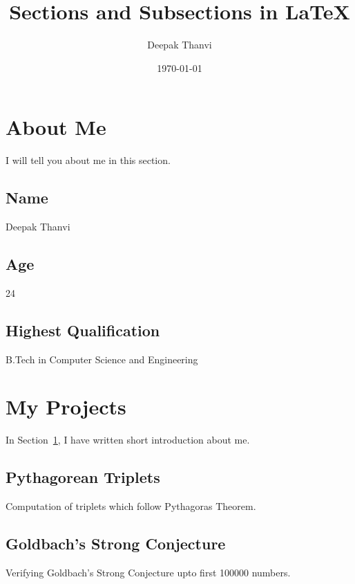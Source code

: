 \documentclass{article}
\title{Sections and Subsections in LaTeX}
\author{Deepak Thanvi}
\date{\today}
\begin{document}
\section{About Me}\label{first_section}
I will tell you about me in this section.

	\subsection{Name}
	
	Deepak Thanvi
	
	\subsection{Age}
	
	24

	\subsection{Highest Qualification}
	
	B.Tech in Computer Science and Engineering
    
\section{My Projects}\label{second_section}
In Section~\ref{first_section}, I have written short introduction about me.

	\subsection{Pythagorean Triplets}
	
	Computation of triplets which follow Pythagoras Theorem.

	\subsection{Goldbach's Strong Conjecture}

	Verifying Goldbach's Strong Conjecture upto first 100000 numbers.    
\end{document}
